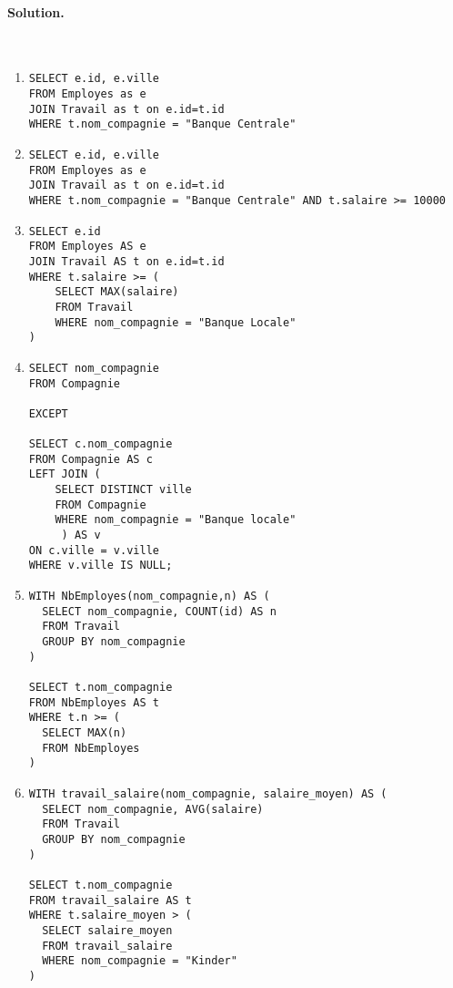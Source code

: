 \paragraph{Solution.}~

\begin{enumerate}
\item 

\begin{lstlisting}
SELECT e.id, e.ville
FROM Employes as e 
JOIN Travail as t on e.id=t.id 
WHERE t.nom_compagnie = "Banque Centrale"
\end{lstlisting}

\item 

\begin{lstlisting}
SELECT e.id, e.ville
FROM Employes as e 
JOIN Travail as t on e.id=t.id 
WHERE t.nom_compagnie = "Banque Centrale" AND t.salaire >= 10000
\end{lstlisting}

\item 

\begin{lstlisting}
SELECT e.id
FROM Employes AS e 
JOIN Travail AS t on e.id=t.id 
WHERE t.salaire >= (
	SELECT MAX(salaire) 
	FROM Travail 
	WHERE nom_compagnie = "Banque Locale"
)
\end{lstlisting}

\item 

\begin{lstlisting}
SELECT nom_compagnie
FROM Compagnie

EXCEPT

SELECT c.nom_compagnie
FROM Compagnie AS c
LEFT JOIN (
    SELECT DISTINCT ville
    FROM Compagnie
    WHERE nom_compagnie = "Banque locale"
     ) AS v
ON c.ville = v.ville
WHERE v.ville IS NULL;
\end{lstlisting}

\item 

\begin{lstlisting}
WITH NbEmployes(nom_compagnie,n) AS (
  SELECT nom_compagnie, COUNT(id) AS n
  FROM Travail
  GROUP BY nom_compagnie
)

SELECT t.nom_compagnie
FROM NbEmployes AS t
WHERE t.n >= (
  SELECT MAX(n)
  FROM NbEmployes
)
\end{lstlisting}

\item 

\begin{lstlisting}
WITH travail_salaire(nom_compagnie, salaire_moyen) AS (
  SELECT nom_compagnie, AVG(salaire)
  FROM Travail
  GROUP BY nom_compagnie
)

SELECT t.nom_compagnie
FROM travail_salaire AS t
WHERE t.salaire_moyen > (
  SELECT salaire_moyen
  FROM travail_salaire
  WHERE nom_compagnie = "Kinder"
) 
\end{lstlisting}

\end{enumerate}
